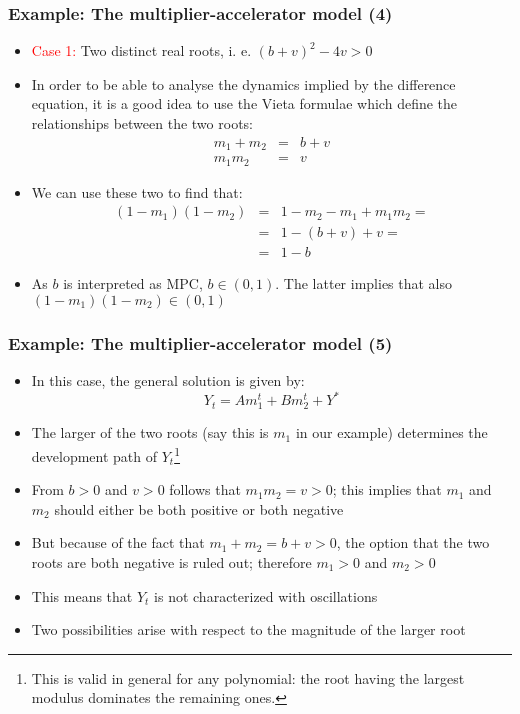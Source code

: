 \documentclass[10pt,usenames,dvipsnames]{beamer}
\theoremstyle{plain}
\theoremstyle{definition}
\begin{document}
\begin{frame}[fragile]
\frametitle{Example: The multiplier-accelerator model (4)}
\begin{itemize}
	\item \textcolor{red}{Case 1:} Two distinct real roots, i. e. $(b+v)^{2} - 4v > 0$ 
	\item In order to be able to analyse the dynamics implied by the difference equation, it is a good idea to use the Vieta formulae which define the relationships between the two roots:
	\[
		\begin{array}{lcl}
			m_{1} + m_{2} & = & b + v\\
			m_{1}m_{2} & = & v
		\end{array}
	\]
	\item We can use these two to find that:
	\[
	\begin{array}{lcl}
		(1 - m_{1})(1 - m_{2}) & = & 1 - m_{2} - m_{1} + m_{1}m_{2} = \\
		& = & 1 - (b + v) + v = \\
		& = & 1 - b
	\end{array}
	\]
	\item As $b$ is interpreted as MPC, $b \in (0,1)$. The latter implies that also $(1 - m_{1})(1 - m_{2}) \in (0,1)$
\end{itemize}
\end{frame}

\begin{frame}[fragile]
\frametitle{Example: The multiplier-accelerator model (5)}
\begin{itemize}
	\item In this case, the general solution is given by:
	\[
		Y_{t} = Am_{1}^{t} + Bm_{2}^{t} + Y^{*}
	\]
	\item The larger of the two roots (say this is $m_{1}$ in our example) determines the development path of $Y_{t}$\footnote{This is valid in general for any polynomial: the root having the largest modulus dominates the remaining ones.}
	\item From $b > 0$ and $v > 0$ follows that $m_{1}m_{2} = v > 0$; this implies that $m_{1}$ and $m_{2}$ should either be both positive or both negative
	\item But because of the fact that $m_{1} + m_{2} = b + v > 0$, the option that the two roots are both negative is ruled out; therefore $m_{1} > 0$ and $m_{2} > 0$
	\item This means that $Y_{t}$ is not characterized with oscillations
	\item Two possibilities arise with respect to the magnitude of the larger root 
\end{itemize}
\end{frame}
\end{document}

